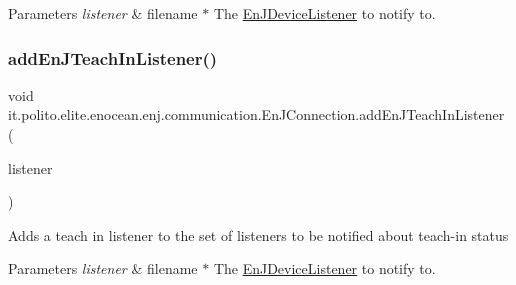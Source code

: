 \begin{DoxyParams}{Parameters}
{\em listener} & filename $\ast$ The \hyperlink{interfaceit_1_1polito_1_1elite_1_1enocean_1_1enj_1_1communication_1_1_en_j_device_listener}{En\+J\+Device\+Listener} to notify to. \\
\hline
\end{DoxyParams}
\hypertarget{classit_1_1polito_1_1elite_1_1enocean_1_1enj_1_1communication_1_1_en_j_connection_a01fd31c05d9a0e262746116086ff2f4a}{}\label{classit_1_1polito_1_1elite_1_1enocean_1_1enj_1_1communication_1_1_en_j_connection_a01fd31c05d9a0e262746116086ff2f4a} 
\subsubsection{\texorpdfstring{add\+En\+J\+Teach\+In\+Listener()}{addEnJTeachInListener()}}
{\footnotesize\ttfamily void it.\+polito.\+elite.\+enocean.\+enj.\+communication.\+En\+J\+Connection.\+add\+En\+J\+Teach\+In\+Listener (\begin{DoxyParamCaption}\item[{\hyperlink{interfaceit_1_1polito_1_1elite_1_1enocean_1_1enj_1_1communication_1_1_en_j_teach_in_listener}{En\+J\+Teach\+In\+Listener}}]{listener }\end{DoxyParamCaption})}

Adds a teach in listener to the set of listeners to be notified about teach-\/in status


\begin{DoxyParams}{Parameters}
{\em listener} & filename $\ast$ The \hyperlink{interfaceit_1_1polito_1_1elite_1_1enocean_1_1enj_1_1communication_1_1_en_j_device_listener}{En\+J\+Device\+Listener} to notify to. \\
\hline
\end{DoxyParams}
\hypertarget{classit_1_1polito_1_1elite_1_1enocean_1_1enj_1_1communication_1_1_en_j_connection_a97719e77975bdc3502ccfff320b3642e}{}\label{classit_1_1polito_1_1elite_1_1enocean_1_1enj_1_1communication_1_1_en_j_connection_a97719e77975bdc3502ccfff320b3642e} 
